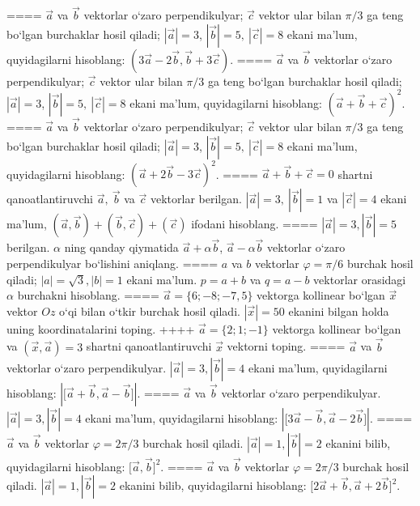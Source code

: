 ====
$\vec{a}$ va $\vec{b}$ vektorlar o‘zaro perpendikulyar; $\vec{c}$ vektor ular bilan $\pi/3$ ga teng bo‘lgan burchaklar hosil qiladi; $|\vec{a}| = 3$, $|\vec{b}| = 5,\ |\vec{c}| = 8$ ekani ma’lum, quyidagilarni hisoblang:
$\left(3\vec{a} - 2\vec{b},\vec{b} + 3\vec{c} \right) $.
====
$\vec{a}$ va $\vec{b}$ vektorlar o‘zaro perpendikulyar; $\vec{c}$ vektor ular bilan $\pi/3$ ga teng bo‘lgan burchaklar hosil qiladi; $|\vec{a}| = 3$, $|\vec{b}| = 5,\ |\vec{c}| = 8$ ekani ma’lum, quyidagilarni hisoblang:
$ (\vec{a} + \vec{b} + \vec{c}) ^{2}$.
====
$\vec{a}$ va $\vec{b}$ vektorlar o‘zaro perpendikulyar; $\vec{c}$ vektor ular bilan $\pi/3$ ga teng bo‘lgan burchaklar hosil qiladi; $|\vec{a}| = 3$, $|\vec{b}| = 5,\ |\vec{c}| = 8$ ekani ma’lum, quyidagilarni hisoblang:
$ (\vec{a} + 2\vec{b} - 3\vec{c}) ^{2}$.
====
$\vec{a} + \vec{b} + \vec{c} = 0$ shartni qanoatlantiruvchi $\vec{a},\ \vec{b}$ va $\vec{c}$ vektorlar berilgan. $|\vec{a}| = 3,\ |\vec{b}| = 1$ va $|\vec{c}| = 4$ ekani ma’lum, $\left(\vec{a},\vec{b} \right) + \left(\vec{b},\vec{c} \right) + (\vec{c}) $ ifodani hisoblang.
====
$|\vec{a}| = 3,|\vec{b}| = 5$ berilgan. $\alpha$ ning qanday qiymatida $\vec{a} + \alpha\vec{b}$, $\vec{a} - \alpha\vec{b}$ vektorlar o‘zaro perpendikulyar bo‘lishini aniqlang.
====
$a$ va $b$ vektorlar $\varphi = \pi/6$ burchak hosil qiladi; $|a| = \sqrt{3},|b| = 1$ ekani ma’lum. $p = a + b$ va $q = a - b$ vektorlar orasidagi $\alpha$ burchakni hisoblang.
====
$\vec{a} = \{ 6; - 8; - 7,5\}$ vektorga kollinear bo‘lgan $\vec{x}$ vektor $Oz$ o‘qi bilan o‘tkir burchak hosil qiladi. $|\vec{x}| = 50$ ekanini bilgan holda uning koordinatalarini toping.
++++
$\vec{a} = \{ 2;1; - 1\}$ vektorga kollinear bo‘lgan va $\left(\vec{x},\vec{a} \right) = 3$ shartni qanoatlantiruvchi $\vec{x}$ vektorni toping.
====
$\vec{a}$ va $\vec{b}$ vektorlar o‘zaro perpendikulyar. $|\vec{a}| = 3,|\vec{b}| = 4$ ekani ma’lum, quyidagilarni hisoblang:
$|\lbrack\vec{a} + \vec{b},\vec{a} - \vec{b}\rbrack|$.
====
$\vec{a}$ va $\vec{b}$ vektorlar o‘zaro perpendikulyar. $|\vec{a}| = 3,|\vec{b}| = 4$ ekani ma’lum, quyidagilarni hisoblang:
$|\lbrack 3\vec{a} - \vec{b},\vec{a}-2\vec{b}\rbrack|$.
====
$\vec{a}$ va $\vec{b}$ vektorlar $\varphi = 2\pi/3$ burchak hosil qiladi. $|\vec{a}| = 1,|\vec{b}| = 2$ ekanini bilib, quyidagilarni hisoblang:
$\lbrack\vec{a},\vec{b}\rbrack^{2}$.
====
$\vec{a}$ va $\vec{b}$ vektorlar $\varphi = 2\pi/3$ burchak hosil qiladi. $|\vec{a}| = 1,|\vec{b}| = 2$ ekanini bilib, quyidagilarni hisoblang:
$\lbrack 2\overrightarrow{a} + \overrightarrow{b},\overrightarrow{a} + 2\overrightarrow{b}\rbrack^{2}$.
